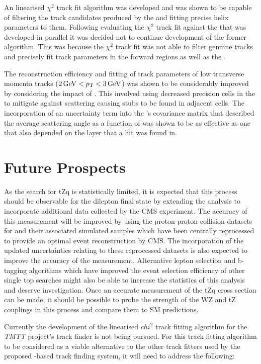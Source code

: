 An linearised $\chi^{2}$ track fit algorithm was developed and was shown to be capable of filtering the track candidates produced by the \HT and fitting precise helix parameters to them.
Following evaluating the $\chi^{2}$ track fit against the \KF that was developed in parallel it was decided not to continue development of the former algorithm.
This was because the $\chi^{2}$ track fit was not able to filter genuine tracks and precisely fit track parameters in the forward regions as well as the \KF.

The reconstruction efficiency and fitting of track parameters of low transverse momenta tracks ($2\,\text{Ge\hspace{-.08em}V} < p_{\mathrm{T}} < 3\,\text{Ge\hspace{-.08em}V}$) was shown to be considerably improved by considering the impact of \MS.
This involved using decreased precision cells in the \HT to mitigate against scattering causing stubs to be found in adjacent \HT cells.
The incorporation of an uncertainty term into the \KF's covariance matrix that described the average scattering angle as a function of \pT was shown to be as effective as one that also depended on the layer that a hit was found in.


\section{Future Prospects}
As the search for tZq is statistically limited, it is expected that this process should be observable for the dilepton final state by extending the analysis to incorporate additional data collected by the CMS experiment.
The accuracy of this measurement will be improved by using the proton-proton collision datasets for and their associated simulated samples which have been centrally reprocessed to provide an optimal event reconstruction by CMS.
The incorporation of the updated uncertainties relating to these reprocessed datasets is also expected to improve the accuracy of the measurement.
Alternative lepton selection and b-tagging algorithms which have improved the event selection efficiency of other single top searches might also be able to increase the statistics of this analysis and deserve investigation.
Once an accurate measurement of the tZq cross section can be made, it should be possible to probe  the strength of the WZ and tZ couplings in this process and compare them to SM predictions.


Currently the development of the linearised $chi^{2}$ track fitting algorithm for the \emph{TMTT} project's track finder is not being pursued.
For this track fitting algorithm to be considered as a viable alternative to the other track fitters used by the proposed \HT-based track finding system, it will need to address the following:

